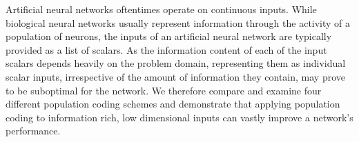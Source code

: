 Artificial neural networks oftentimes operate on continuous inputs. 
While biological neural networks usually represent information through the activity of a population of neurons, 
the inputs of an artificial neural network are typically provided as a list of scalars. 
As the information content of each of the input scalars depends heavily on the problem domain, 
representing them as individual scalar inputs, irrespective of the amount of information they contain, may prove to be suboptimal for the network. 
We therefore compare and examine four different population coding schemes and demonstrate that 
applying population coding to information rich, low dimensional inputs can vastly improve a network's performance.